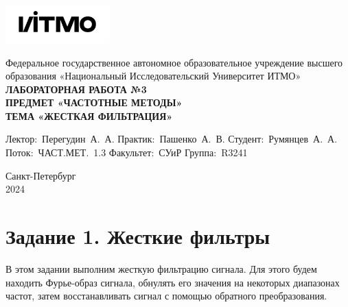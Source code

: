 \documentclass[a4paper, 12pt]{article}
\begin{document}
    \begin{titlepage}

        \begin{center}
        \includegraphics[width=0.3\textwidth]{itmo.png} %
        \vfill
        
        Федеральное государственное автономное образовательное учреждение высшего образования
        «Национальный Исследовательский Университет ИТМО»\\
        
        \vfill
        {\large\bf ЛАБОРАТОРНАЯ РАБОТА №3}\\
        {\large\bf ПРЕДМЕТ «ЧАСТОТНЫЕ МЕТОДЫ»}\\
        {\large\bf ТЕМА «ЖЕСТКАЯ ФИЛЬТРАЦИЯ»}
        \vfill

        \begin{flushright}
            \begin{minipage}{.45\textwidth}
            {
                \hbox{Лектор: Перегудин А. А.}
                \hbox{Практик: Пашенко А. В.}
                \hbox{Студент: Румянцев А. А.}
                \hbox{Поток: ЧАСТ.МЕТ. 1.3}
                \hbox{}
                \hbox{Факультет: СУиР}
                \hbox{Группа: R3241}
            }
            \end{minipage}
        \end{flushright}
        
        \vfill
                
        Санкт-Петербург\\
        2024
        \end{center}
    \end{titlepage}
    
    \tableofcontents

    \newpage
    \section{Задание 1. Жесткие фильтры}
    В этом задании выполним жесткую фильтрацию сигнала. Для этого будем находить Фурье-образ сигнала, обнулять его значения
    на некоторых диапазонах частот, затем восстанавливать сигнал с помощью обратного преобразования.
\end{document}
